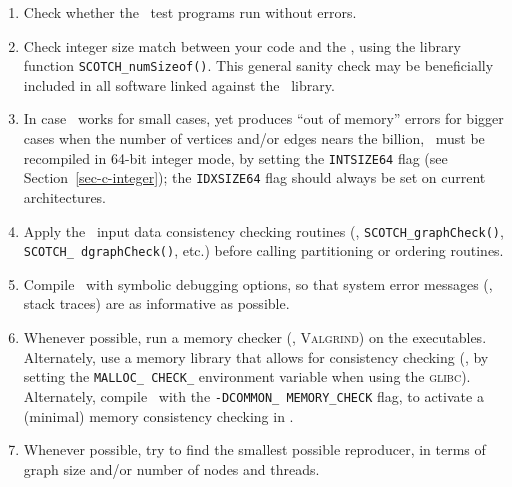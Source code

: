 \begin{enumerate}
\item
Check whether the \scotch\ test programs run without errors.
\item
Check integer size match between your code and the \libscotch, using
the library function \texttt{SCOTCH\_\lbt numSizeof()}. This general
sanity check may be beneficially included in all software linked
against the \libscotch\ library.
\item
In case \scotch\ works for small cases, yet produces ``out of memory''
errors for bigger cases when the number of vertices and/or edges
nears the billion, \scotch\ must be recompiled in 64-bit integer mode,
by setting the \texttt{INTSIZE64} flag (see
Section~\ref{sec-c-integer}); the \texttt{IDXSIZE64} flag should
always be set on current architectures.
\item
Apply the \scotch\ input data consistency checking routines (\eg,
\texttt{SCOTCH\_\lbt graph\lbt Check()}, \texttt{SCOTCH\_\lbt
dgraph\lbt Check()}, etc.) before calling partitioning or ordering
routines.
\item
Compile \scotch\ with symbolic debugging options, so that system error
messages (\eg, stack traces) are as informative as possible.
\item
Whenever possible, run a memory checker (\eg, \textsc{Valgrind}) on
the executables. Alternately, use a memory library that allows for
consistency checking (\eg, by setting the \texttt{MALLOC\_\lbt
CHECK\_} environment variable when using the \textsc{glibc}).
Alternately, compile \scotch\ with the \texttt{-DCOMMON\_\lbt
MEMORY\_\lbt CHECK} flag, to activate a (minimal) memory consistency
checking in \scotch.
\item
Whenever possible, try to find the smallest possible reproducer, in
terms of graph size and/or number of nodes and threads.
\end{enumerate}

\begin{center}
\end{center}
